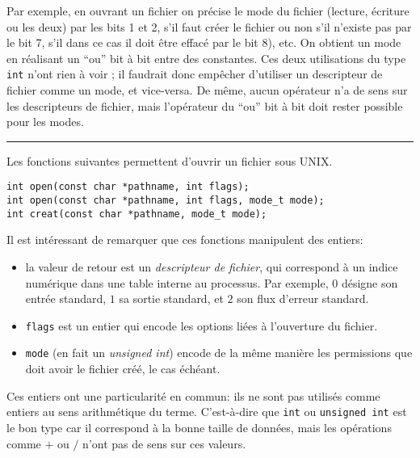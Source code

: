 \def\tBits{\textsc{Bits}\xspace}

Par exemple, en ouvrant un fichier on précise le mode du fichier (lecture,
écriture ou les deux) par les bits 1 et 2, s'il faut créer le fichier ou non
s'il n'existe pas par le bit 7, s'il dans ce cas il doit être effacé par le bit
8), etc. On obtient un mode en réalisant un ``ou'' bit à bit entre des
constantes. Ces deux utilisations du type \texttt{int} n'ont rien à voir ; il
faudrait donc empêcher d'utiliser un descripteur de fichier comme un mode, et
vice-versa. De même, aucun opérateur n'a de sens sur les descripteurs de
fichier, mais l'opérateur \texttt{\textbar{}} du ``ou'' bit à bit doit rester
possible pour les modes.

\begin{center}\rule{3in}{0.4pt}\end{center}

Les fonctions suivantes permettent d'ouvrir un fichier sous UNIX.

\begin{verbatim}
int open(const char *pathname, int flags);
int open(const char *pathname, int flags, mode_t mode);
int creat(const char *pathname, mode_t mode);
\end{verbatim}

Il est intéressant de remarquer que ces fonctions manipulent des entiers:

\begin{itemize}

\item la valeur de retour est un \emph{descripteur de fichier}, qui correspond à
un indice numérique dans une table interne au processus. Par exemple, $0$
désigne son entrée standard, $1$ sa sortie standard, et $2$ son flux d'erreur
standard.

\item \texttt{flags} est un entier qui encode les options liées à l'ouverture du
fichier.

\item \texttt{mode} (en fait un \emph{unsigned int}) encode de la même manière
les permissions que doit avoir le fichier créé, le cas échéant.

\end{itemize}

Ces entiers ont une particularité en commun: ils ne sont pas utilisés comme
entiers au sens arithmétique du terme. C'est-à-dire que \texttt{int} ou
\texttt{unsigned int} est le bon type car il correspond à la bonne taille de
données, mais les opérations comme $+$ ou $/$ n'ont pas de sens sur ces valeurs.

